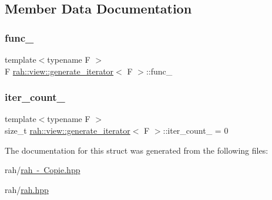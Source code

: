 \subsection{Member Data Documentation}
\mbox{\label{structrah_1_1view_1_1generate__iterator_a72f19774c5fddd0a04a293bd08dce1cd}} 
\subsubsection{\texorpdfstring{func\_}{func\_}}
{\footnotesize\ttfamily template$<$typename F $>$ \\
F \mbox{\hyperlink{structrah_1_1view_1_1generate__iterator}{rah\+::view\+::generate\+\_\+iterator}}$<$ F $>$\+::func\+\_\+\hspace{0.3cm}{\ttfamily [mutable]}}

\mbox{\label{structrah_1_1view_1_1generate__iterator_a66d7843d9aefee7179023c5c13fa05c1}} 
\subsubsection{\texorpdfstring{iter\_count\_}{iter\_count\_}}
{\footnotesize\ttfamily template$<$typename F $>$ \\
size\+\_\+t \mbox{\hyperlink{structrah_1_1view_1_1generate__iterator}{rah\+::view\+::generate\+\_\+iterator}}$<$ F $>$\+::iter\+\_\+count\+\_\+ = 0}



The documentation for this struct was generated from the following files\+:\begin{DoxyCompactItemize}
\item 
rah/\mbox{\hyperlink{rah_01-_01_copie_8hpp}{rah -\/ Copie.\+hpp}}\item 
rah/\mbox{\hyperlink{rah_8hpp}{rah.\+hpp}}\end{DoxyCompactItemize}
